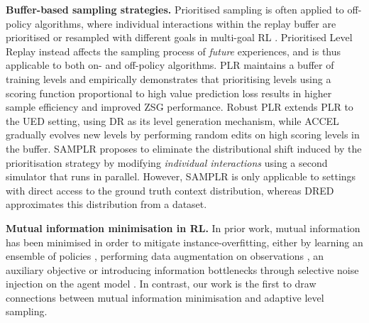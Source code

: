 \documentclass{article}
\theoremstyle{plain}
\theoremstyle{definition}
\theoremstyle{remark}
\begin{document}
\textbf{Buffer-based sampling strategies.} Prioritised sampling is often applied to off-policy algorithms, where individual interactions within the replay buffer are prioritised \citep{Schaul2015PrioritizedER} or resampled with different goals in multi-goal RL \citep{HER,zhang2020automatic}. Prioritised Level Replay \citep[PLR,][]{PLR} instead affects the sampling process of \textit{future} experiences, and is thus applicable to both on- and off-policy algorithms. PLR maintains a buffer of training levels and empirically demonstrates that prioritising levels using a scoring function proportional to high value prediction loss results in higher sample efficiency and improved ZSG performance. Robust PLR \citep[RPLR,][]{Robust-PLR} extends PLR to the UED setting, using DR as its level generation mechanism, while ACCEL \citep{ACCEL} gradually evolves new levels by performing random edits on high scoring levels in the buffer. SAMPLR \citep{SAMPLR} proposes to  eliminate the distributional shift induced by the prioritisation strategy by modifying \textit{individual interactions} using a second simulator that runs in parallel. However, SAMPLR is only applicable to settings with direct access to the ground truth context distribution, whereas DRED approximates this distribution from a dataset.



\textbf{Mutual information minimisation in RL.} In prior work, mutual information has been minimised in order to mitigate instance-overfitting, either by learning an ensemble of policies \citep{instance_invariant,E-POMDP}, performing data augmentation on observations \citep{raileanu2021UCB-DrAC,Kostrikov2021ImageAllYouNeed}, an auxiliary objective \citep{mhairiCMID,dunion2024mvd} or introducing information bottlenecks through selective noise injection on the agent model \citep{vib_actor_critic,coinrun}. In contrast, our work is the first to draw connections between mutual information minimisation and adaptive level sampling.
%
\end{document}
